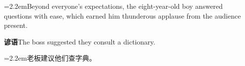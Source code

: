 \documentclass[11pt,a4paper]{article}
\newcommand{\num}[1]{\makebox[1.9em][r]{#1.}\hspace{0.3em}}
\begin{document}
\vspace{0.15em}

\noindent\hangindent=2.2em\hspace{2.2em}Beyond everyone’s expectations, the eight-year-old boy answered questions with ease, which earned him thunderous applause from the audience present.

\vspace{0.4em}\noindent{\color{rulegray}\rule{\textwidth}{0.6pt}}\vspace{0.4em}

\num{5}\textbf{谚语}\quad The boss suggested they consult a dictionary.

\vspace{0.15em}

\noindent\hangindent=2.2em\hspace{2.2em}老板建议他们查字典。
\end{document}
